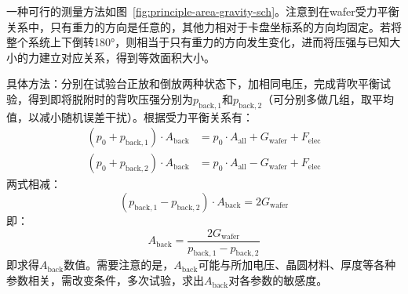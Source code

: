 一种可行的测量方法如图~\ref{fig:principle-area-gravity-sch}。注意到在wafer受力平衡关系中，只有重力的方向是任意的，其他力相对于卡盘坐标系的方向均固定。若将整个系统上下倒转\ang{180}，则相当于只有重力的方向发生变化，进而将压强与已知大小的力建立对应关系，得到等效面积大小。

具体方法：分别在试验台正放和倒放两种状态下，加相同电压，完成背吹平衡试验，得到即将脱附时的背吹压强分别为$p_{\mathrm{back},1}$和$p_{\mathrm{back},2}$（可分别多做几组，取平均值，以减小随机误差干扰）。根据受力平衡关系有：
\begin{equation}
\label{eq:principle-area-gravity-orig}
\begin{aligned}
(p_{0} + p_{\mathrm{back},1}) \cdot A_{\mathrm{back}} & = p_0 \cdot A_{\mathrm{all}} + G_{\mathrm{wafer}} + F_{\mathrm{elec}} \\
(p_{0} + p_{\mathrm{back},2}) \cdot A_{\mathrm{back}} & = p_0 \cdot A_{\mathrm{all}} - G_{\mathrm{wafer}} + F_{\mathrm{elec}}
\end{aligned}
\end{equation}
两式相减：
\[
(p_{\mathrm{back},1} - p_{\mathrm{back},2}) \cdot A_{\mathrm{back}} = 2 G_{\mathrm{wafer}}
\]
即：
\begin{equation}
\label{eq:principle-area-gravity-derived}
A_{\mathrm{back}} = \frac{2 G_{\mathrm{wafer}}}{p_{\mathrm{back},1} - p_{\mathrm{back},2}}
\end{equation}
即求得$A_{\mathrm{back}}$数值。需要注意的是，$A_{\mathrm{back}}$可能与所加电压、晶圆材料、厚度等各种参数相关，需改变条件，多次试验，求出$A_{\mathrm{back}}$对各参数的敏感度。




